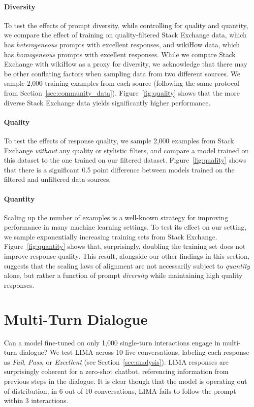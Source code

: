\documentclass{article}
\begin{document}
\paragraph{Diversity}
To test the effects of prompt diversity, while controlling for quality and quantity, we compare the effect of training on quality-filtered Stack Exchange data, which has \textit{heterogeneous} prompts with excellent responses, and wikiHow data, which has \textit{homogeneous} prompts with excellent responses.
While we compare Stack Exchange with wikiHow as a proxy for diversity, we acknowledge that there may be other conflating factors when sampling data from two different sources.
We sample 2,000 training examples from each source (following the same protocol from Section~\ref{sec:community_data}).
Figure~\ref{fig:quality} shows that the more diverse Stack Exchange data yields significantly higher performance.

\paragraph{Quality}
To test the effects of response quality, we sample 2,000 examples from Stack Exchange \textit{without} any quality or stylistic filters, and compare a model trained on this dataset to the one trained on our filtered dataset.
Figure~\ref{fig:quality} shows that there is a significant 0.5 point difference between models trained on the filtered and unfiltered data sources.

\paragraph{Quantity}
Scaling up the number of examples is a well-known strategy for improving performance in many machine learning settings.
To test its effect on our setting, we sample exponentially increasing training sets from Stack Exchange.
Figure~\ref{fig:quantity} shows that, surprisingly, doubling the training set does not improve response quality.
This result, alongside our other findings in this section, suggests that the scaling laws of alignment are not necessarily subject to \textit{quantity} alone, but rather a function of prompt \textit{diversity} while maintaining high quality responses.

\section{Multi-Turn Dialogue}

Can a model fine-tuned on only 1,000 single-turn interactions engage in multi-turn dialogue?
We test LIMA across 10 live conversations, labeling each response as \textit{Fail}, \textit{Pass}, or \textit{Excellent} (see Section~\ref{sec:analysis}).
LIMA responses are surprisingly coherent for a zero-shot chatbot, referencing information from previous steps in the dialogue.
It is clear though that the model is operating out of distribution; in 6 out of 10 conversations, LIMA fails to follow the prompt within 3 interactions.
\end{document}

